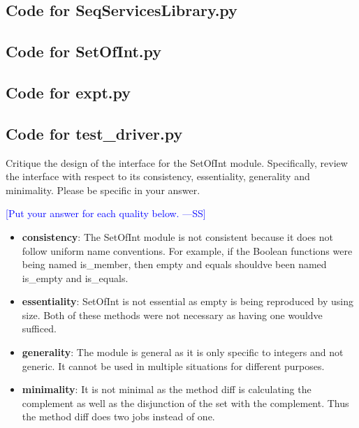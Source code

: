 \documentclass[12pt,fleqn]{examtst}
\newcommand{\authornote}[3]{\textcolor{#1}{[#3 ---#2]}}
\newcommand{\authornote}[3]{}
\newcommand{\wss}[1]{\authornote{blue}{SS}{#1}}
\begin{document}
\newpage

\subsection*{Code for SeqServicesLibrary.py}

\noindent 

\newpage

\subsection*{Code for SetOfInt.py}

\noindent 

\newpage

\subsection*{Code for expt.py}

\noindent 

\newpage

\subsection*{Code for test\_driver.py}

\noindent 

\newpage


\noindent
\begin{minipage}{\textwidth}

Critique the design of the interface for the SetOfInt module.  Specifically,
review the interface with respect to its consistency, essentiality, generality
and minimality.  Please be specific in your answer.

\wss{Put your answer for each quality below.}

\begin{itemize}
\item \textbf{consistency}: The SetOfInt module is not consistent because it does not follow uniform name conventions. For example, if the Boolean functions were 
being named is\_member, then empty and equals shouldve been named is\_empty and is\_equals.
\item \textbf{essentiality}:
SetOfInt is not essential as empty is being reproduced by using size. Both of these methods were not necessary as having one wouldve sufficed.
\item \textbf{generality}:
The module is general as it is only specific to integers and not generic. It cannot be used in multiple situations for different purposes.
\item \textbf{minimality}:
It is not minimal as the method diff is calculating the complement as well as the disjunction of the set with the complement. Thus the method
diff does two jobs instead of one.
\end{itemize}

\end{minipage}
\end{document}

